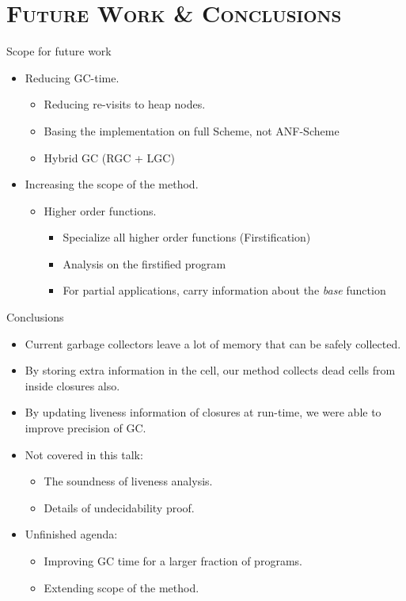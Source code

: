\documentclass[xcolor=x11names,compress,mathserif]{beamer}
\renewcommand{\(}{\begin{columns}}
\renewcommand{\)}{\end{columns}}
\newcommand{\<}[1]{\begin{column}{#1}}
\renewcommand{\>}{\end{column}}
\begin{document}
\section{\scshape Future Work  \& Conclusions} 
\begin{frame}{Scope for future work}
\normalsize
\begin{itemize}\itemsep2em
\item<1-> Reducing GC-time.
  \begin{itemize}
  \item Reducing re-visits to heap nodes.
  \item Basing the implementation on full Scheme, not ANF-Scheme
  \item Hybrid GC (RGC + LGC)
  \end{itemize}
\item<2-> Increasing the scope of the method.
  \begin{itemize}
   \item Higher order functions.
    \begin{itemize}
    \item Specialize all higher order functions (Firstification)
    \item Analysis on the firstified program 
    \item For partial applications, carry information about the {\em base} function
    \end{itemize}
  \end{itemize}
\end{itemize}
\end{frame}

\begin{frame}{Conclusions}
  \begin{itemize}\itemsep1em
  \item Current garbage collectors leave a lot of memory that can be safely collected. 
  \item By storing extra information in the cell, our method collects dead cells from inside closures also.
  \item By updating liveness information of closures at run-time, we were able to improve precision of GC.
  \item Not covered in this talk:
    \begin{itemize}
    \item The soundness of liveness analysis.
    \item Details of undecidability proof.
    \end{itemize}
    \item Unfinished agenda:
      \begin{itemize}
      \item Improving GC time for a larger fraction of programs.
      \item Extending scope of the method.
    \end{itemize}
  \end{itemize}
\end{frame}
\end{document}
